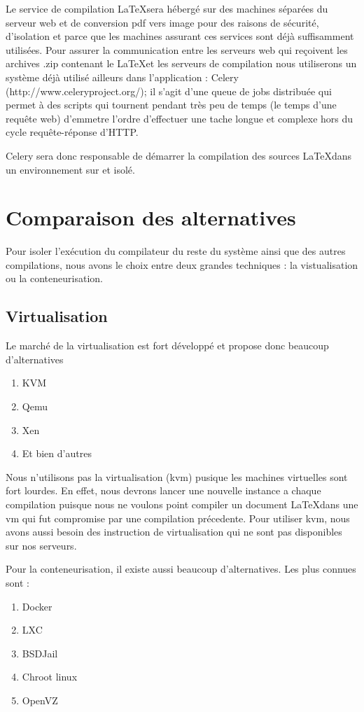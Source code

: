 \documentclass[10pt,a4paper]{article}
\begin{document}
Le service de compilation \LaTeX sera hébergé sur des machines séparées du serveur web et de conversion pdf vers image pour des raisons de sécurité, d'isolation et parce que les machines assurant ces services sont déjà suffisamment utilisées.
Pour assurer la communication entre les serveurs web qui reçoivent les archives .zip contenant le \LaTeX et les serveurs de compilation nous utiliserons un système déjà utilisé ailleurs dans l'application :
Celery (http://www.celeryproject.org/); il s'agit d'une queue de jobs distribuée qui permet à des scripts qui tournent pendant très peu de temps (le temps d'une requête web) d'emmetre l'ordre d'effectuer une tache longue et complexe hors du cycle requête-réponse d'HTTP.

Celery sera donc responsable de démarrer la compilation des sources \LaTeX dans un environnement sur et isolé.


\section{Comparaison des alternatives}
Pour isoler l'exécution du compilateur du reste du système ainsi que des autres compilations, nous avons le choix entre deux grandes techniques : la vistualisation ou la conteneurisation.

\subsection{Virtualisation}
Le marché de la virtualisation est fort développé et propose donc beaucoup d'alternatives
\begin{enumerate}
    \item{KVM}
    \item{Qemu}
    \item{Xen}
    \item{Et bien d'autres}
\end{enumerate}

Nous n'utilisons pas la virtualisation (kvm) pusique les machines virtuelles sont fort lourdes.
En effet, nous devrons lancer une nouvelle instance a chaque compilation puisque nous ne voulons point compiler un document \LaTeX dans une vm qui fut compromise par une compilation précedente.
Pour utiliser kvm, nous avons aussi besoin des instruction de virtualisation qui ne sont pas disponibles sur nos serveurs.


Pour la conteneurisation, il existe aussi beaucoup d'alternatives. Les plus connues sont :
\begin{enumerate}
    \item{Docker}
    \item{LXC}
    \item{BSDJail}
    \item{Chroot linux}
    \item{OpenVZ}
\end{enumerate}
\end{document}
